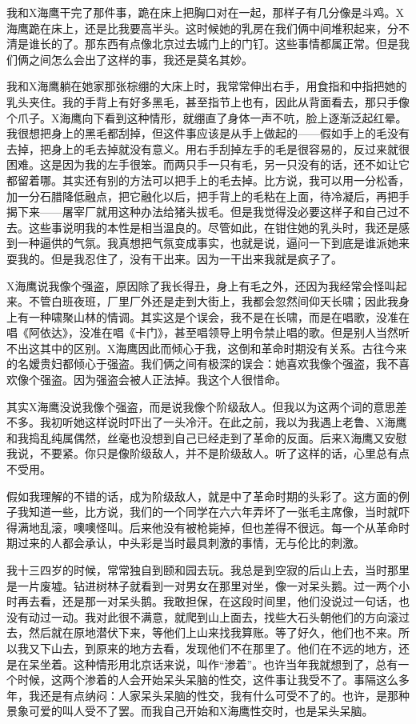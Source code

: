 我和X海鹰干完了那件事，跪在床上把胸口对在一起，那样子有几分像是斗鸡。X海鹰跪在床上，还是比我要高半头。这时候她的乳房在我们俩中间堆积起来，分不清是谁长的了。那东西有点像北京过去城门上的门钉。这些事情都属正常。但是我们俩之间怎么会出了这样的事，我还是莫名其妙。 

我和X海鹰躺在她家那张棕绷的大床上时，我常常伸出右手，用食指和中指把她的乳头夹住。我的手背上有好多黑毛，甚至指节上也有，因此从背面看去，那只手像个爪子。X海鹰向下看到这种情形，就绷直了身体一声不吭，脸上逐渐泛起红晕。我很想把身上的黑毛都刮掉，但这件事应该是从手上做起的——假如手上的毛没有去掉，把身上的毛去掉就没有意义。用右手刮掉左手的毛是很容易的，反过来就很困难。这是因为我的左手很笨。而两只手一只有毛，另一只没有的话，还不如让它都留着哪。其实还有别的方法可以把手上的毛去掉。比方说，我可以用一分松香，加一分石腊降低融点，把它融化以后，把手背上的毛粘在上面，待冷凝后，再把手揭下来——屠宰厂就用这种办法给猪头拔毛。但是我觉得没必要这样子和自己过不去。这些事说明我的本性是相当温良的。尽管如此，在钳住她的乳头时，我还是感到一种逼供的气氛。我真想把气氛变成事实，也就是说，逼问一下到底是谁派她来耍我的。但是我忍住了，没有干出来。因为一干出来我就是疯子了。 

X海鹰说我像个强盗，原因除了我长得丑，身上有毛之外，还因为我经常会怪叫起来。不管白班夜班，厂里厂外还是走到大街上，我都会忽然间仰天长啸；因此我身上有一种啸聚山林的情调。其实这是个误会，我不是在长啸，而是在唱歌，没准在唱《阿依达》，没准在唱《卡门》，甚至唱领导上明令禁止唱的歌。但是别人当然听不出这其中的区别。X海鹰因此而倾心于我，这倒和革命时期没有关系。古往今来的名嫒贵妇都倾心于强盗。我们俩之间有极深的误会：她喜欢我像个强盗，我不喜欢像个强盗。因为强盗会被人正法掉。我这个人很惜命。 

其实X海鹰没说我像个强盗，而是说我像个阶级敌人。但我以为这两个词的意思差不多。我初听她这样说时吓出了一头冷汗。在此之前，我以为我遇上老鲁、X海鹰和我捣乱纯属偶然，丝毫也没想到自己已经走到了革命的反面。后来X海鹰又安慰我说，不要紧。你只是像阶级敌人，并不是阶级敌人。听了这样的话，心里总有点不受用。 

假如我理解的不错的话，成为阶级敌人，就是中了革命时期的头彩了。这方面的例子我知道一些，比方说，我们的一个同学在六六年弄坏了一张毛主席像，当时就吓得满地乱滚，噢噢怪叫。后来他没有被枪毙掉，但也差得不很远。每一个从革命时期过来的人都会承认，中头彩是当时最具刺激的事情，无与伦比的刺激。 

我十三四岁的时候，常常独自到颐和园去玩。我总是到空寂的后山上去，当时那里是一片废墟。钻进树林子就看到一对男女在那里对坐，像一对呆头鹅。过一两个小时再去看，还是那一对呆头鹅。我敢担保，在这段时间里，他们没说过一句话，也没有动过一动。我对此很不满意，就爬到山上面去，找些大石头朝他们的方向滚过去，然后就在原地潜伏下来，等他们上山来找我算账。等了好久，他们也不来。所以我又下山去，到原来的地方去看，发现他们不在那里了。他们在不远的地方，还是在呆坐着。这种情形用北京话来说，叫作“渗着”。也许当年我就想到了，总有一个时候，这两个渗着的人会开始呆头呆脑的性交，这件事让我受不了。事隔这么多年，我还是有点纳闷：人家呆头呆脑的性交，我有什么可受不了的。也许，是那种景象可爱的叫人受不了罢。而我自己开始和X海鹰性交时，也是呆头呆脑。 

